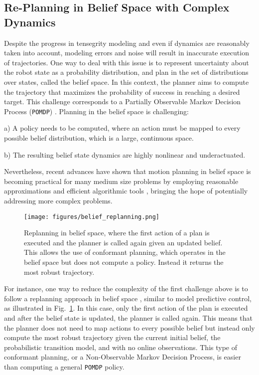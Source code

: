 \subsection{Re-Planning in Belief Space with Complex Dynamics}

Despite the progress in tensegrity modeling and even if dynamics are
reasonably taken into account, modeling errors and noise will result
in inaccurate execution of trajectories. One way to deal with this
issue is to represent uncertainty about the robot state as a
probability distribution, and plan in the set of distributions over
states, called the belief space. In this context, the planner aims to
compute the trajectory that maximizes the probability of success in
reaching a desired target. This challenge corresponds to a Partially
Observable Markov Decision Process ({\tt POMDP})
\cite{Kaebling:1998aa}. Planning in the belief space is challenging:
\begin{myitem}
\item[a)] A policy needs to be computed, where an action must be mapped
  to every possible belief distribution, which is a large, continuous
  space.
\item[b)] The resulting belief state dynamics are highly nonlinear
  and underactuated.
\end{myitem}
Nevertheless, recent advances have shown that motion planning in
belief space is becoming practical for many medium size problems by
employing reasonable approximations and efficient algorithmic tools
\cite{Platt:2010aa,Bai:2012aa}, bringing the
hope of potentially addressing more complex problems.

\begin{figure}[h!]
  \vspace{-.1in}
  \centering
\texttt{[image: figures/belief\_replanning.png]}
\vspace{-0.3in}
\caption{Replanning in belief space, where the first action of a plan
  is executed and the planner is called again given an updated
  belief. This allows the use of conformant planning, which operates
  in the belief space but does not compute a policy. Instead it
  returns the most robust trajectory.}\vspace{-0.1in}
\label{fig:belief_replanning}
\end{figure}

For instance, one way to reduce the complexity of the first challenge
above is to follow a replanning approach in belief space
\cite{Platt:2010aa}, similar to model predictive control, as
illustrated in Fig.~\ref{fig:belief_replanning}. In this case, only
the first action of the plan is executed and after the belief state is
updated, the planner is called again. This means that the planner does
not need to map actions to every possible belief but instead only
compute the most robust trajectory given the current initial belief,
the probabilistic transition model, and with no online observations.
This type of conformant planning, or a Non-Observable Markov Decision
Process, is easier than computing a general {\tt POMDP} policy.

